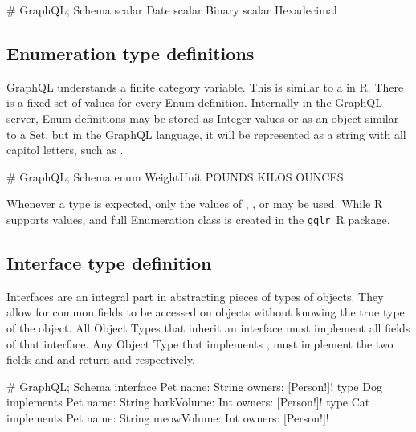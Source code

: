 \documentclass[stat,dissertation]{puthesis}\usepackage[]{graphicx}\usepackage{xcolor}
\newcommand{\pkg}[1]{\texttt{#1}}
\newcommand{\gqlr}{\pkg{gqlr}}
\begin{document}
\begin{graphqlcode}
# GraphQL; Schema
scalar Date
scalar Binary
scalar Hexadecimal
\end{graphqlcode}



\subsection{Enumeration type definitions}

GraphQL understands a finite category variable.  This is similar to a  in R.  There is a fixed set of values for every Enum definition.  Internally in the GraphQL server, Enum definitions may be stored as Integer values or as an object similar to a Set, but in the GraphQL language, it will be represented as a string with all capitol letters, such as .

\begin{graphqlcode}
# GraphQL; Schema
enum WeightUnit {
  POUNDS
  KILOS
  OUNCES
}
\end{graphqlcode}

Whenever a  type is expected, only the values of , , or  may be used.  While R supports  values, and full Enumeration class is created in the \gqlr~R package.


\subsection{Interface type definition}

Interfaces are an integral part in abstracting pieces of types of objects.  They allow for common fields to be accessed on objects without knowing the true type of the object.  All Object Types that inherit an interface must implement all fields of that interface.  Any Object Type that implements , must implement the two fields  and  and return  and \graphqlinline{[Person!]!} respectively.

\begin{graphqlcode}
# GraphQL; Schema
interface Pet {
  name: String
  owners: [Person!]!
}
type Dog implements Pet {
  name: String
  barkVolume: Int
  owners: [Person!]!
}
type Cat implements Pet {
  name: String
  meowVolume: Int
  owners: [Person!]!
}
\end{graphqlcode}
\end{document}

